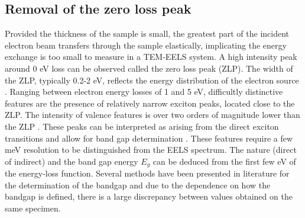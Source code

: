 \documentclass[11pt,a4paper]{article}
\numberwithin{equation}{section}
\numberwithin{figure}{section}
\numberwithin{table}{section}
\begin{document}
\subsection{Removal of the zero loss peak}
Provided the thickness of the sample is small, the greatest part of the incident electron beam transfers through the sample elastically, implicating the energy exchange is too small to measure in a TEM-EELS system. A high intensity peak around 0 eV loss can be observed called the zero loss peak (ZLP). The width of the ZLP, typically 0.2-2 eV, reflects the energy distribution of the electron source \cite{Egerton:2009}. Ranging between electron energy losses of 1 and 5 eV, difficultly distinctive features are the presence of relatively narrow exciton peaks, located close to the ZLP. The intensity of valence features is over two orders of magnitude lower than the ZLP \cite{Abajo:2010}. These peaks can be interpreted as arising from the direct exciton transitions and allow for band gap determination \cite{Stoger:2008}. These features require a few meV resolution to be distinguished from the EELS spectrum. The nature (direct of indirect) and the band gap energy $E_g$ can be deduced from the first few eV of the energy-loss function. Several methods have been presented in literature for the determination of the bandgap and due to the dependence on how the bandgap is defined, there is a large discrepancy between values obtained on the same specimen.\\
\end{document}
